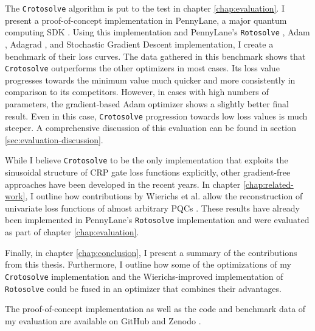 The \texttt{Crotosolve} algorithm is put to the test in chapter
\ref{chap:evaluation}.
I present a proof-of-concept implementation in PennyLane, a major quantum
computing SDK \cite{bergholm_pennylane_2022,unitary_fund_team_results_2022}.
Using this implementation and PennyLane's
\texttt{Rotosolve} \cite{ostaszewski_structure_2021},
Adam \cite{kingma_adam_2017},
Adagrad \cite{duchi_adaptive_2011}, and
Stochastic Gradient Descent implementation, I create a benchmark of their loss
curves.
The data gathered in this benchmark shows that \texttt{Crotosolve} outperforms
the other optimizers in most cases.
Its loss value progresses towards the minimum value much quicker and more
consistently in comparison to its competitors.
However, in cases with high numbers of parameters, the gradient-based Adam
optimizer shows a slightly better final result.
Even in this case, \texttt{Crotosolve} progression towards low loss values is
much steeper. 
A comprehensive discussion of this evaluation can be found in section
\ref{sec:evaluation-discussion}.

While I believe \texttt{Crotosolve} to be the only implementation that exploits
the sinusoidal structure of CRP gate loss functions explicitly, other
gradient-free approaches have been developed in the recent years.
In chapter \ref{chap:related-work}, I outline how contributions by
Wierichs et al. allow the reconstruction of univariate loss functions of almost
arbitrary PQCs \cite{wierichs_general_2022}.
These results have already been implemented in PennyLane's \texttt{Rotosolve}
implementation and were evaluated as part of chapter \ref{chap:evaluation}.

Finally, in chapter \ref{chap:conclusion}, I present a summary of the
contributions from this thesis.
Furthermore, I outline how some of the optimizations of my \texttt{Crotosolve}
implementation and the Wierichs-improved implementation of \texttt{Rotosolve}
could be fused in an optimizer that combines their advantages.

The proof-of-concept implementation as well as the code and benchmark data of my
evaluation are available on GitHub and Zenodo
\cite{schweikart_schweikartcrotosolve_2023}.
